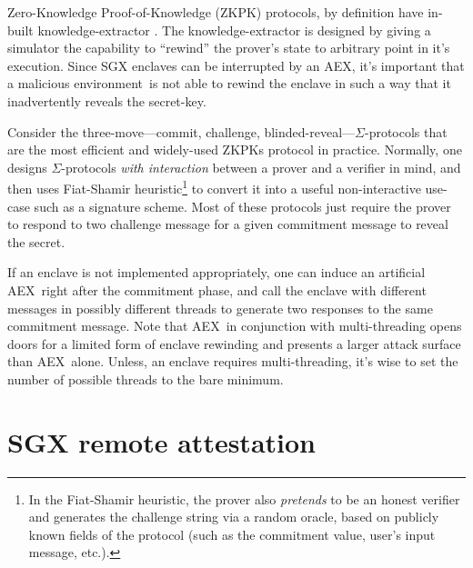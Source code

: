 \documentclass[letterpaper]{article}
\newcommand{\aex}{\textsf{AEX}}
\newcommand{\env}{\textsf{environment}}
\begin{document}
  Zero-Knowledge Proof-of-Knowledge (ZKPK) protocols, by definition
  have in-built knowledge-extractor \cite{BellarePOK, maurerZKP}. The
  knowledge-extractor is designed by giving a simulator the capability
  to ``rewind'' the prover's state to arbitrary point in it's
  execution. Since SGX enclaves can be interrupted by an \aex, it's
  important that a malicious \env\ is not able to rewind the enclave
  in such a way that it inadvertently reveals the secret-key.

  Consider the three-move---commit, challenge,
  blinded-reveal---$\Sigma$-protocols \cite{sigmaprotocol} that are
  the most efficient and widely-used ZKPKs protocol in practice.
  Normally, one designs $\Sigma$-protocols \textit{with interaction}
  between a prover and a verifier in mind, and then uses Fiat-Shamir
  \cite{FiatShamir} heuristic\footnote{In the Fiat-Shamir heuristic,
    the prover also \textit{pretends} to be an honest verifier and
    generates the challenge string via a random oracle, based on
    publicly known fields of the protocol (such as the commitment
    value, user's input message, etc.).} to convert it into a useful
  non-interactive use-case such as a signature scheme. Most of these
  protocols just require the prover to respond to two challenge
  message for a given commitment message to reveal the secret.

  If an enclave is not implemented appropriately, one can induce an
  artificial \aex\ right after the commitment phase, and call the
  enclave with different messages in possibly different threads to
  generate two responses to the same commitment message. Note that
  \aex\ in conjunction with multi-threading opens doors for a limited
  form of enclave rewinding and presents a larger attack surface than
  \aex\ alone. Unless, an enclave requires multi-threading, it's wise
  to set the number of possible threads to the bare minimum.

  \section{SGX remote attestation}
  \label{sec:remoteatt}
\end{document}
